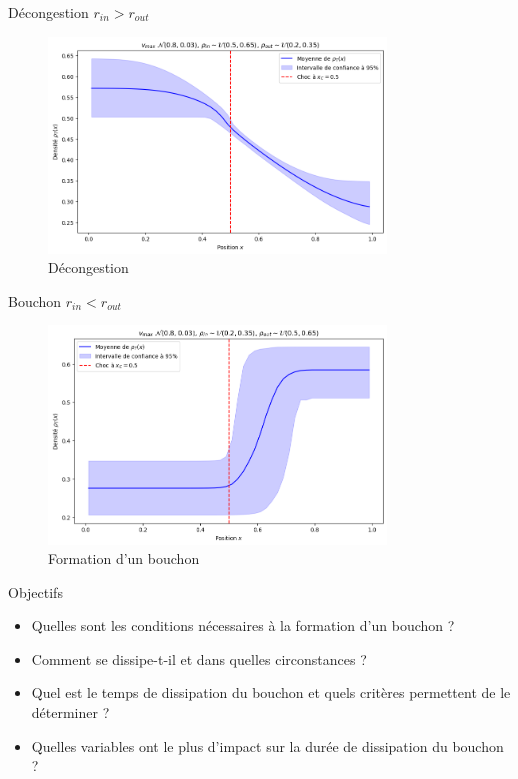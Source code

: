 \documentclass[10pt]{beamer}
\begin{document}
\begin{frame}{Décongestion}
  $r_{in} > r_{out}$ \\
  \begin{figure}
    \centering
    \includegraphics[width=0.8\textwidth]{images/rin_greater_rout.png}
    \caption{Décongestion}
  \end{figure}
\end{frame}

\begin{frame}{Bouchon}
  $r_{in} < r_{out}$ \\
  \begin{figure}
    \centering
    \includegraphics[width=0.8\textwidth]{images/rin_less_rout.png}
    \caption{Formation d'un bouchon}
  \end{figure}
\end{frame}

\begin{frame}{Objectifs}
  \begin{itemize}
    \item Quelles sont les conditions nécessaires à la formation d'un bouchon ?
    \item Comment se dissipe-t-il et dans quelles circonstances ?
    \item Quel est le temps de dissipation du bouchon et quels critères permettent de le déterminer ?
    \item Quelles variables ont le plus d'impact sur la durée de dissipation du bouchon ?
  \end{itemize}
\end{frame}
\end{document}

